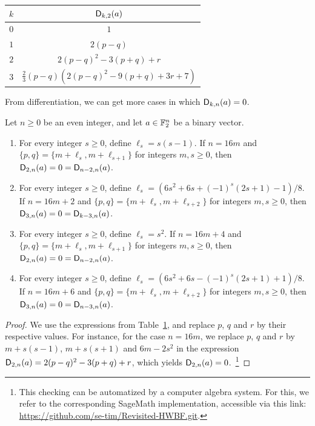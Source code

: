 \documentclass{llncs}
\begin{document}
\begin{table}
	\scriptsize
	\centering
	\begin{tabular}{|c|c|}
		\hline
		$k$ & $\Dnka 2ka$\\
		\hline
		$0$&$1$\\
		$1$&$2(p-q)$\\ 
		$2$&$2(p-q)^2-3(p+q)+r$\\
		$3$&$\frac 23(p-q)\left(2(p-q)^2-9(p+q)+3r+7\right)$\\
		\hline
	\end{tabular}
	\label{tab:Dnka_small_k}
\end{table}

From differentiation, we can get more cases in which $\Dnka nka=0$.

\begin{proposition}
    Let $n\geq 0$ be an even integer, and let $a\in\F_2^n$ be a binary vector.
    \begin{enumerate}
        \item For every integer $s\geq0$, define $\ell_s=s(s-1)$. If $n=16m$ and $\{p,q\}=\{m+\ell_s,m+\ell_{s+1}\}$ for integers $m,s\geq 0$, then $\Dnka n2a=0=\Dnka n{n-2}a$.
        \item For every integer $s\geq 0$, define $\ell_s=\left(6s^2+6s+(-1)^s(2s+1)-1\right)/8$. If $n=16m+2$ and $\{p,q\}=\{m+\ell_s,m+\ell_{s+2}\}$ for integers $m,s\geq 0$, then $\Dnka n3a=0=\Dnka n{k-3}a$.
        \item For every integer $s\geq 0$, define $\ell_s=s^2$. If $n=16m+4$ and $\{p,q\}=\{m+\ell_s,m+\ell_{s+1}\}$ for integers $m,s\geq 0$, then $\Dnka n2a=0=\Dnka n{n-2}a$.
        \item For every integer $s\geq 0$, define $\ell_s=\left(6s^2+6s-(-1)^s(2s+1)+1\right)/8$. If $n=16m+6$ and $\{p,q\}=\{m+\ell_s,m+\ell_{s+2}\}$ for integers $m,s\geq 0$, then $\Dnka n3a=0=\Dnka n{n-3}a$.
    \end{enumerate}
\end{proposition}

\begin{proof}
	We use the expressions from Table~\ref{tab:Dnka_small_k}, and replace $p$, $q$ and $r$ by their respective values. For instance, for the case $n=16m$, we replace $p$, $q$ and $r$ by $m+s(s-1)$, $m+s(s+1)$ and $6m-2s^2$ in the expression $\Dnka n2a=2(p-q)^2-3(p+q)+r$, which yields $\Dnka n2a=0$.~\footnote{This checking can be automatized by a computer algebra system.
	\ifnum{}
		For this, we refer to the corresponding \textsf{SageMath} implementation, accessible via this link: \url{https://github.com/se-tim/Revisited-HWBF.git}.
	\fi}
\end{proof}
\end{document}
